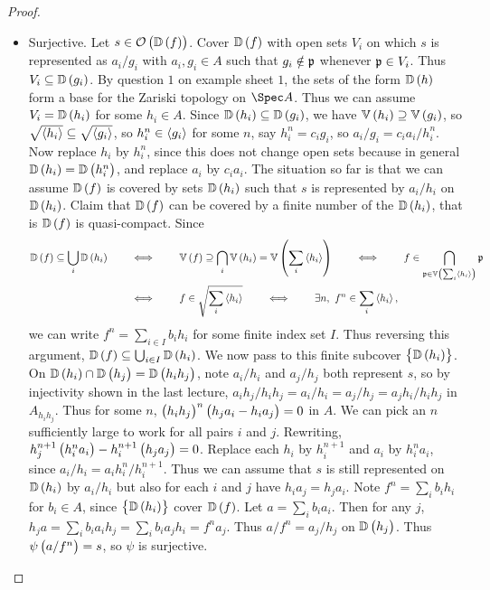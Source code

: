 \begin{proof}
\begin{itemize}
\item Surjective. Let $ s \in \OOO\br{\DD\br{f}} $. Cover $ \DD\br{f} $ with open sets $ V_i $ on which $ s $ is represented as $ a_i / g_i $ with $ a_i, g_i \in A $ such that $ g_i \notin \mathfrak{p} $ whenever $ \mathfrak{p} \in V_i $. Thus $ V_i \subseteq \DD\br{g_i} $. By question $ 1 $ on example sheet $ 1 $, the sets of the form $ \DD\br{h} $ form a base for the Zariski topology on $ \Spec A $. Thus we can assume $ V_i = \DD\br{h_i} $ for some $ h_i \in A $. Since $ \DD\br{h_i} \subseteq \DD\br{g_i} $, we have $ \VV\br{h_i} \supseteq \VV\br{g_i} $, so $ \sqrt{\left\langle h_i \right\rangle} \subseteq \sqrt{\left\langle g_i \right\rangle} $, so $ h_i^n \in \left\langle g_i \right\rangle $ for some $ n $, say $ h_i^n = c_ig_i $, so $ a_i / g_i = c_ia_i / h_i^n $. Now replace $ h_i $ by $ h_i^n $, since this does not change open sets because in general $ \DD\br{h_i} = \DD\br{h_i^n} $, and replace $ a_i $ by $ c_ia_i $. The situation so far is that we can assume $ \DD\br{f} $ is covered by sets $ \DD\br{h_i} $ such that $ s $ is represented by $ a_i / h_i $ on $ \DD\br{h_i} $. Claim that $ \DD\br{f} $ can be covered by a finite number of the $ \DD\br{h_i} $, that is $ \DD\br{f} $ is quasi-compact. Since
\begin{align*}
\DD\br{f} \subseteq \bigcup_i \DD\br{h_i} \qquad
& \iff \qquad \VV\br{f} \supseteq \bigcap_i \VV\br{h_i} = \VV\br{\sum_i \abr{h_i}}
\qquad \iff \qquad f \in \bigcap_{\ppp \in \VV\br{\sum_i \abr{h_i}}} \ppp \\
& \iff \qquad f \in \sqrt{\sum_i \abr{h_i}}
\qquad \iff \qquad \exists n, \ f^n \in \sum_i \abr{h_i},
\end{align*}
we can write $ f^n = \sum_{i \in I} b_ih_i $ for some finite index set $ I $. Thus reversing this argument, $ \DD\br{f} \subseteq \bigcup_{i \in I} \DD\br{h_i} $. We now pass to this finite subcover $ \cbr{\DD\br{h_i}} $. On $ \DD\br{h_i} \cap \DD\br{h_j} = \DD\br{h_ih_j} $, note $ a_i / h_i $ and $ a_j / h_j $ both represent $ s $, so by injectivity shown in the last lecture, $ a_ih_j / h_ih_j = a_i / h_i = a_j / h_j = a_jh_i / h_ih_j $ in $ A_{h_ih_j} $. Thus for some $ n $, $ \br{h_ih_j}^n\br{h_ja_i - h_ia_j} = 0 $ in $ A $. We can pick an $ n $ sufficiently large to work for all pairs $ i $ and $ j $. Rewriting, $ h_j^{n + 1}\br{h_i^na_i} - h_i^{n + 1}\br{h_ja_j} = 0 $. Replace each $ h_i $ by $ h_i^{n + 1} $ and $ a_i $ by $ h_i^na_i $, since $ a_i / h_i = a_ih_i^n / h_i^{n + 1} $. Thus we can assume that $ s $ is still represented on $ \DD\br{h_i} $ by $ a_i / h_i $ but also for each $ i $ and $ j $ have $ h_ia_j = h_ja_i $. Note $ f^n = \sum_ib_ih_i $ for $ b_i \in A $, since $ \cbr{\DD\br{h_i}} $ cover $ \DD\br{f} $. Let $ a = \sum_i b_ia_i $. Then for any $ j $, $ h_ja = \sum_i b_ia_ih_j = \sum_i b_ia_jh_i = f^na_j $. Thus $ a / f^n = a_j / h_j $ on $ \DD\br{h_j} $. Thus $ \psi\br{a / f^n} = s $, so $ \psi $ is surjective.
\end{itemize}
\end{proof}

